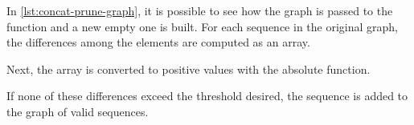 In \cref{lst:concat-prune-graph}, it is possible to see how the graph is passed to the function and a new empty one is built. 
For each sequence in the original graph, the differences among the elements are computed as an array. 

Next, the array is converted to positive values with the absolute function. 

If none of these differences exceed the threshold desired, the sequence is added to the graph of valid sequences. 


